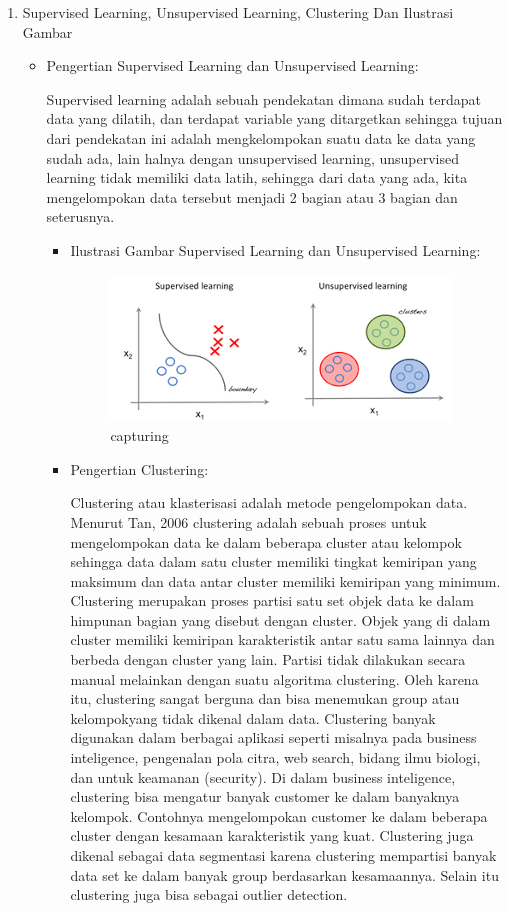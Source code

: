 \begin{enumerate}
\item Supervised Learning, Unsupervised Learning, Clustering Dan Ilustrasi Gambar
\begin{itemize}
\item Pengertian Supervised Learning dan Unsupervised Learning:

Supervised learning adalah sebuah pendekatan dimana sudah terdapat data yang dilatih, dan terdapat variable yang ditargetkan sehingga tujuan dari pendekatan ini adalah mengkelompokan suatu data ke data yang sudah ada, lain halnya dengan unsupervised learning, unsupervised learning tidak memiliki data latih, sehingga dari data yang ada, kita mengelompokan data tersebut menjadi 2 bagian atau 3 bagian dan seterusnya.

\begin{itemize}
\item Ilustrasi Gambar Supervised Learning dan Unsupervised Learning:

\begin{figure}[ht]
\centering
\includegraphics[scale=0.5]{figures/Chapter2-AnnisaFathoroni2.png}
\caption{capturing}
\label{contoh}
\end{figure}

\item Pengertian Clustering:

Clustering atau klasterisasi adalah metode pengelompokan data. Menurut Tan, 2006 clustering adalah sebuah proses untuk mengelompokan data ke dalam beberapa cluster atau kelompok sehingga data dalam satu cluster memiliki tingkat kemiripan yang maksimum dan data antar cluster memiliki kemiripan yang minimum. Clustering merupakan proses partisi satu set objek data ke dalam himpunan bagian yang disebut dengan cluster. Objek yang di dalam cluster memiliki kemiripan karakteristik antar satu sama lainnya dan berbeda dengan cluster yang lain. Partisi tidak dilakukan secara manual melainkan dengan suatu algoritma clustering. Oleh karena itu, clustering sangat berguna dan bisa menemukan group atau kelompokyang tidak dikenal dalam data. Clustering banyak digunakan dalam berbagai aplikasi seperti misalnya pada business inteligence, pengenalan pola citra, web search, bidang ilmu biologi, dan untuk keamanan (security). Di dalam business inteligence, clustering bisa mengatur banyak customer ke dalam banyaknya kelompok. Contohnya mengelompokan customer ke dalam beberapa cluster dengan kesamaan karakteristik yang kuat. Clustering juga dikenal sebagai data segmentasi karena clustering mempartisi banyak data set ke dalam banyak group berdasarkan kesamaannya. Selain itu clustering juga bisa sebagai outlier detection.


\end{itemize}
\end{itemize}
\end{enumerate}
